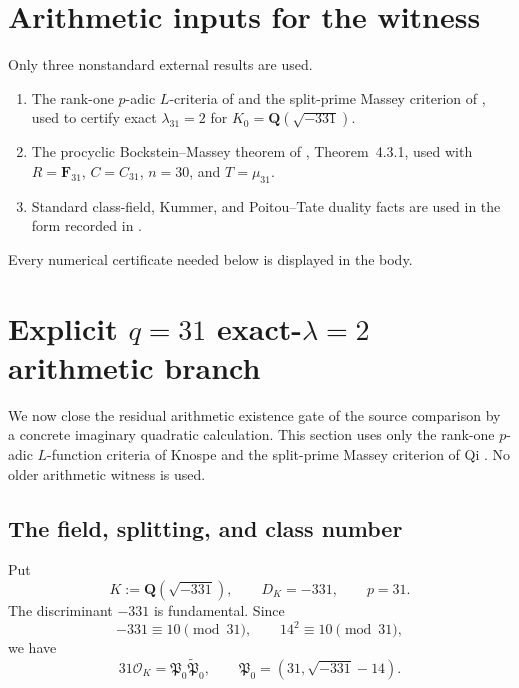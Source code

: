 \documentclass[11pt]{article}
\theoremstyle{remark}
\begin{document}
\section{Arithmetic inputs for the witness}\label{sec:external-inputs}

Only three nonstandard external results are used.
\begin{enumerate}[label=\textup{(X\arabic*)},leftmargin=3.2em]
\item\label{X:knospe-qi} The rank-one \(p\)-adic \(L\)-criteria of \cite{KnospeSpecialValues2026} and the split-prime Massey criterion of \cite{QiMasseyLambda}, used to certify exact \(\lambda_{31}=2\) for \(K_0=\mathbf Q(\sqrt{-331})\).
\item\label{X:llsww} The procyclic Bockstein--Massey theorem of \cite{LLSWW}, Theorem~4.3.1, used with \(R=\mathbf F_{31}\), \(C=C_{31}\), \(n=30\), and \(T=\mu_{31}\).
\item Standard class-field, Kummer, and Poitou--Tate duality facts are used in the form recorded in \cite{NSW}.
\end{enumerate}
Every numerical certificate needed below is displayed in the body.
\section{Explicit \texorpdfstring{\(q=31\) exact-\(\lambda=2\)}{q=31 exact-lambda=2} arithmetic branch}
\label{sec:v063-explicit-lambda2}

We now close the residual arithmetic existence gate of the source comparison by a
concrete imaginary quadratic calculation.  This section uses only the
rank-one \(p\)-adic \(L\)-function criteria of Knospe
\cite{KnospeSpecialValues2026} and the split-prime Massey criterion of Qi
\cite{QiMasseyLambda}.  No older arithmetic witness is used.

\subsection{The field, splitting, and class number}

Put
\begin{equation}
 \boxed{
 K:=\mathbf Q(\sqrt{-331}),
 \qquad D_K=-331,
 \qquad p=31.
 }
 \label{eq:v063-field}
\end{equation}
The discriminant \(-331\) is fundamental.  Since
\[
 -331\equiv 10\pmod{31},
 \qquad
 14^2\equiv10\pmod{31},
\]
we have
\begin{equation}
 \boxed{
 31\mathcal O_K=\mathfrak P_0\widetilde{\mathfrak P}_0,
 \qquad
 \mathfrak P_0=(31,\sqrt{-331}-14).
 }
 \label{eq:v063-splitting}
\end{equation}
\end{document}
